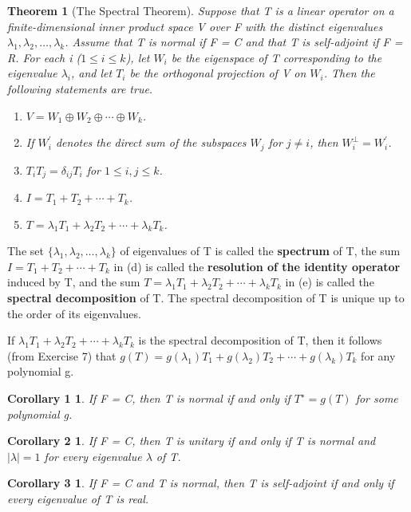\documentclass{article}
\newcommand{\abs}[1]{\left\lvert#1\right\rvert}
\newcommand{\bd}[1]{\textbf{#1}}
\newcommand{\enumalph}[0]{\begin{enumerate}[label=(\alph*)]}
\theoremstyle{plain}
\newtheorem{theorem}{Theorem}[section]
\newtheorem*{corollary1}{Corollary 1}
\newtheorem*{corollary2}{Corollary 2}
\newtheorem*{corollary3}{Corollary 3}
\theoremstyle{plain} %
\begin{document}
\begin{theorem}[The Spectral Theorem]
  Suppose that T is a linear operator on a finite-dimensional inner product space V over F with the distinct eigenvalues $\lambda_1, \lambda_2,\ldots,\lambda_k$. Assume that T is normal if F = C and that T is self-adjoint if F = R. For each i ($1 \leq i \leq k$), let $W_i$ be the eigenspace of T corresponding to the eigenvalue $\lambda_i$, and let $T_i$ be the orthogonal projection of V on $W_i$. Then the following statements are true.
  \enumalph
  \item $V = W_1 \oplus W_2 \oplus\cdots\oplus W_k$.
  \item If $W^\prime_i$ denotes the direct sum of the subspaces $W_j$ for $j \neq i$, then $W^\perp_i = W^\prime_i$.
  \item $T_iT_j = \delta_{ij}T_i$ for $1 \leq i, j \leq k$.
  \item $I = T_1 + T_2 + \cdots + T_k$.
  \item $T = \lambda_1T_1 + \lambda_2T_2 + \cdots + \lambda_kT_k$.
  \end{enumerate}
  
\end{theorem}

The set $\{\lambda_1, \lambda_2,\ldots,\lambda_k\}$ of eigenvalues of T is called the \bd{spectrum} of T, the sum $I = T_1+T_2+\cdots+T_k$ in (d) is called the \bd{resolution of the identity operator} induced by T, and the sum $T = \lambda_1T_1 + \lambda_2T_2 + \cdots + \lambda_kT_k$ in (e) is called the \bd{spectral decomposition} of T. The spectral decomposition of
T is unique up to the order of its eigenvalues.

If $\lambda_1T_1 + \lambda_2T_2 + \cdots + \lambda_kT_k$ is the spectral decomposition of T, then it follows (from Exercise 7) that $g(T) = g(\lambda_1)T_1 + g(\lambda_2)T_2 + \cdots + g(\lambda_k)T_k$ for any polynomial g. 

\begin{corollary1}
  If F = C, then T is normal if and only if $T^∗ = g(T)$ for some polynomial g.
\end{corollary1}

\begin{corollary2}
  If F = C, then T is unitary if and only if T is normal and $\abs{\lambda} = 1$ for every eigenvalue $\lambda$ of T.
\end{corollary2}

\begin{corollary3}
  If F = C and T is normal, then T is self-adjoint if and only if every eigenvalue of T is real.
\end{corollary3}
\end{document}
